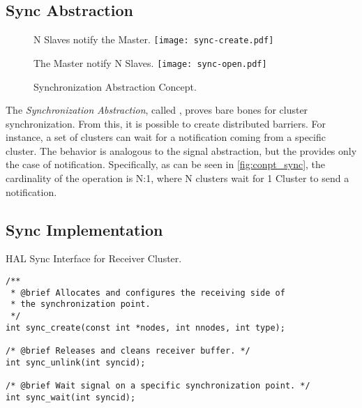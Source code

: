 		\subsection{Sync Abstraction}
		\label{sec.sync-abs}

			\begin{figure}[!tb]
				\centering%
				\caption{Synchronization Abstraction Concept.}%
				\label{fig:conpt_sync}%

					{N Slaves notify the Master.}%
					{\texttt{[image: sync-create.pdf]}}%

				\hfill

					{The Master notify N Slaves.}%
					{\texttt{[image: sync-open.pdf]}}%

			\end{figure}


			The \textit{Synchronization Abstraction}, called \sync, proves bare bones
			for cluster synchronization.
			From this, it is possible to create distributed barriers.
			For instance, a set of clusters can wait for a notification coming
			from a specific cluster.
			The behavior is analogous to the \posix signal abstraction, but the \sync
			provides only the case of notification.
			Specifically, as can be seen in \autoref{fig:conpt_sync}, the
			cardinality of the operation is N:1, where N clusters wait for 1 Cluster
			to send a notification.

			\subsection*{Sync Implementation}

\begin{listing}[!tb]
\caption{HAL Sync Interface for Receiver Cluster.}
\label{code:sync-receiver}
\begin{verbatim}
/**
 * @brief Allocates and configures the receiving side of
 * the synchronization point.
 */
int sync_create(const int *nodes, int nnodes, int type);

/* @brief Releases and cleans receiver buffer. */
int sync_unlink(int syncid);

/* @brief Wait signal on a specific synchronization point. */
int sync_wait(int syncid);
\end{verbatim}
\end{listing}


